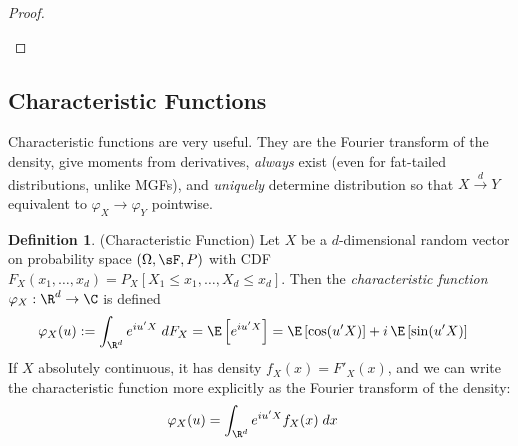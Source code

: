 \documentclass[12pt]{article}
\theoremstyle{plain}
\theoremstyle{definition}
\newtheorem{defn}[thm]{Definition}
\theoremstyle{remark}
\newcommand{\ra}{\rightarrow}
\newcommand{\dto}{\xrightarrow{d}}
\begin{document}
\begin{proof}
\begin{enumerate}
\end{enumerate}
\end{proof}


\clearpage
\subsection{Characteristic Functions}

Characteristic functions are very useful.
They are the Fourier transform of the density,
give moments from derivatives, \emph{always} exist (even for
fat-tailed distributions, unlike MGFs), and \emph{uniquely} determine
distribution so that $X\dto Y$ equivalent to $\varphi_X \ra
\varphi_Y$ pointwise.

\begin{defn}(Characteristic Function)
Let $X$ be a $d$-dimensional random vector on probability space
$(\Omega,\sF,P)$ with CDF
$F_{X}(x_1,\ldots,x_d)
=
P_X[X_1\leq x_1,\ldots, X_d\leq x_d]$.
Then the \emph{characteristic function} $\varphi_X:\R^d\ra \C$ is
defined
\begin{align*}
  \varphi_X(u)
  &:= \int_{\R^d} e^{iu'X} \; dF_{X}
  = \E\left[e^{iu'X}\right] =
  \E\left[\cos(u'X)\right]+i\,\E\left[\sin(u'X)\right]
\end{align*}
If $X$ absolutely continuous, it has density $f_{X}(x)=F'_X(x)$, and we
can write the characteristic function more explicitly as the Fourier
transform of the density:
\begin{align*}
  \varphi_X(u)
  &=
  \int_{\R^d} e^{iu'X} f_{X}(x)\; dx
\end{align*}
\end{defn}
\end{document}
